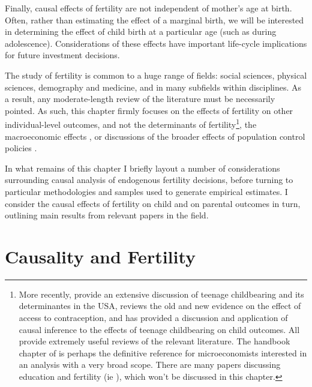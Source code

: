 Finally, causal effects of fertility are not independent of mother's age at 
birth.  Often, rather than estimating the effect of a marginal birth, we will be
interested in determining the effect of child birth at a particular age (such as
during adolescence).  Considerations of these effects have important life-cycle
implications for future investment decisions.

The study of fertility is common to a huge range of fields: social sciences, 
physical sciences, demography and medicine, and in many subfields within 
disciplines.  As a result, any moderate-length review of the literature must
be necessarily pointed.  As such, this chapter firmly focuses on the effects
of fertility on other individual-level outcomes, and not the determinants of
fertility\footnote{More recently, \citet{KearneyLevine2012} provide an extensive 
discussion of teenage childbearing and its determinantes in the USA, 
\citet{Bailey2013} reviews the old and new evidence on the effect of access to 
contraception, and \citet{Moffitt2005} has provided a discussion and application 
of causal inference to the effects of teenage childbearing on child outcomes. All
provide extremely useful reviews of the relevant literature.  The handbook chapter
of \citet{Schultz2008} is perhaps the definitive reference for microeconomists
interested in an analysis with a very broad scope.  There are many papers
discussing education and fertility (ie \citet{Blacketal2008}), which won't be 
discussed in this chapter.}, the macroeconomic effects \citep{Enke1966,Enke1971}, 
or discussions of the broader effects of population control policies
\citep{GMiller2009,RosenzweigWolpin1986}.

In what remains of this chapter I briefly layout a number of considerations
surrounding causal analysis of endogenous fertility decisions, before turning to
particular methodologies and samples used to generate empirical estimates.  I
consider the causal effects of fertility on child and on parental outcomes in
turn, outlining main results from relevant papers in the field.

\section{Causality and Fertility}
\label{Fscn:causality}
